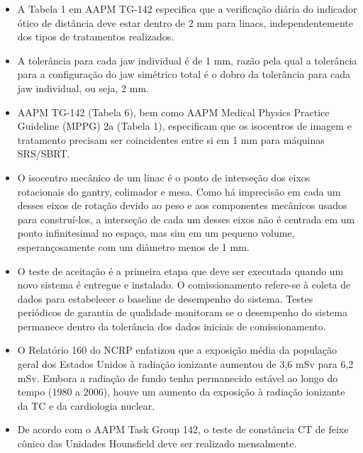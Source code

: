 \documentclass[11pt,a4paper]{article}
\newcounter{exemplo}
\begin{document}
\begin{exemplo}
    \begin{itemize}
        \item A Tabela 1 em AAPM TG-142 especifica que a verificação diária do indicador ótico de distância deve estar dentro de 2 mm para linacs, independentemente dos tipos de tratamentos realizados.
        
        \item A tolerância para cada jaw individual é de 1 mm, razão pela qual a tolerância para a configuração do jaw simétrico total é o dobro da tolerância para cada jaw individual, ou seja, 2 mm.
        
        \item AAPM TG-142 (Tabela 6), bem como AAPM Medical Physics Practice Guideline (MPPG) 2a (Tabela 1), especificam que os isocentros de imagem e tratamento precisam ser coincidentes entre si em 1 mm para máquinas SRS/SBRT.
        
        \item O isocentro mecânico de um linac é o ponto de interseção dos eixos rotacionais do gantry, colimador e mesa. Como há imprecisão em cada um desses eixos de rotação devido ao peso e aos componentes mecânicos usados para construí-los, a interseção de cada um desses eixos não é centrada em um ponto infinitesimal no espaço, mas sim em um pequeno volume, esperançosamente com um diâmetro menos de 1 mm.
        
        \item O teste de aceitação é a primeira etapa que deve ser executada quando um novo sistema é entregue e instalado. O comissionamento refere-se à coleta de dados para estabelecer o baseline de desempenho do sistema. Testes periódicos de garantia de qualidade monitoram se o desempenho do sistema permanece dentro da tolerância dos dados iniciais de comissionamento.
        
        \item O Relatório 160 do NCRP enfatizou que a exposição média da população geral dos Estados Unidos à radiação ionizante aumentou de 3,6 mSv para 6,2 mSv. Embora a radiação de fundo tenha permanecido estável ao longo do tempo (1980 a 2006), houve um aumento da exposição à radiação ionizante da TC e da cardiologia nuclear.
                
        \item De acordo com o AAPM Task Group 142, o teste de constância CT de feixe cônico das Unidades Hounsfield deve ser realizado mensalmente.
                

\end{itemize}
\end{exemplo}
\end{document}
